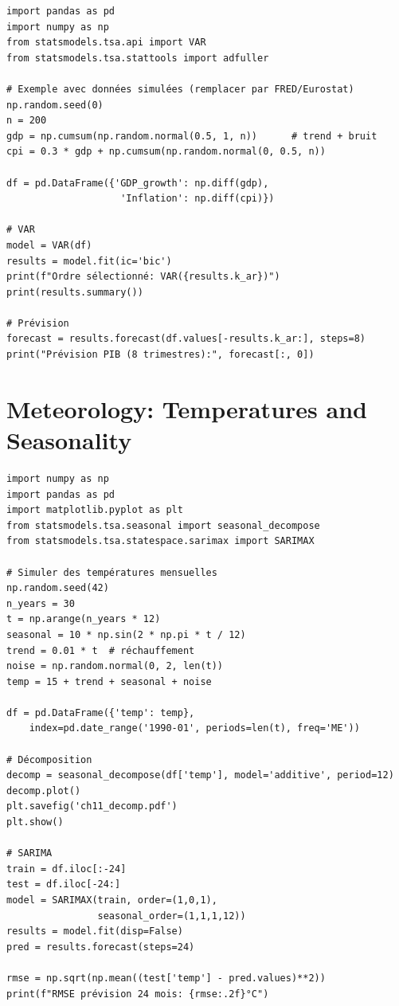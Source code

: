 \begin{codeblock}[title=\textbf{Python --- Macro Forecasting}]
\begin{verbatim}
import pandas as pd
import numpy as np
from statsmodels.tsa.api import VAR
from statsmodels.tsa.stattools import adfuller

# Exemple avec données simulées (remplacer par FRED/Eurostat)
np.random.seed(0)
n = 200
gdp = np.cumsum(np.random.normal(0.5, 1, n))      # trend + bruit
cpi = 0.3 * gdp + np.cumsum(np.random.normal(0, 0.5, n))

df = pd.DataFrame({'GDP_growth': np.diff(gdp),
                    'Inflation': np.diff(cpi)})

# VAR
model = VAR(df)
results = model.fit(ic='bic')
print(f"Ordre sélectionné: VAR({results.k_ar})")
print(results.summary())

# Prévision
forecast = results.forecast(df.values[-results.k_ar:], steps=8)
print("Prévision PIB (8 trimestres):", forecast[:, 0])
\end{verbatim}
\end{codeblock}

\section{Meteorology: Temperatures and Seasonality}

\begin{codeblock}[title=\textbf{Python --- Temperature Series}]
\begin{verbatim}
import numpy as np
import pandas as pd
import matplotlib.pyplot as plt
from statsmodels.tsa.seasonal import seasonal_decompose
from statsmodels.tsa.statespace.sarimax import SARIMAX

# Simuler des températures mensuelles
np.random.seed(42)
n_years = 30
t = np.arange(n_years * 12)
seasonal = 10 * np.sin(2 * np.pi * t / 12)
trend = 0.01 * t  # réchauffement
noise = np.random.normal(0, 2, len(t))
temp = 15 + trend + seasonal + noise

df = pd.DataFrame({'temp': temp},
    index=pd.date_range('1990-01', periods=len(t), freq='ME'))

# Décomposition
decomp = seasonal_decompose(df['temp'], model='additive', period=12)
decomp.plot()
plt.savefig('ch11_decomp.pdf')
plt.show()

# SARIMA
train = df.iloc[:-24]
test = df.iloc[-24:]
model = SARIMAX(train, order=(1,0,1),
                seasonal_order=(1,1,1,12))
results = model.fit(disp=False)
pred = results.forecast(steps=24)

rmse = np.sqrt(np.mean((test['temp'] - pred.values)**2))
print(f"RMSE prévision 24 mois: {rmse:.2f}°C")
\end{verbatim}
\end{codeblock}

